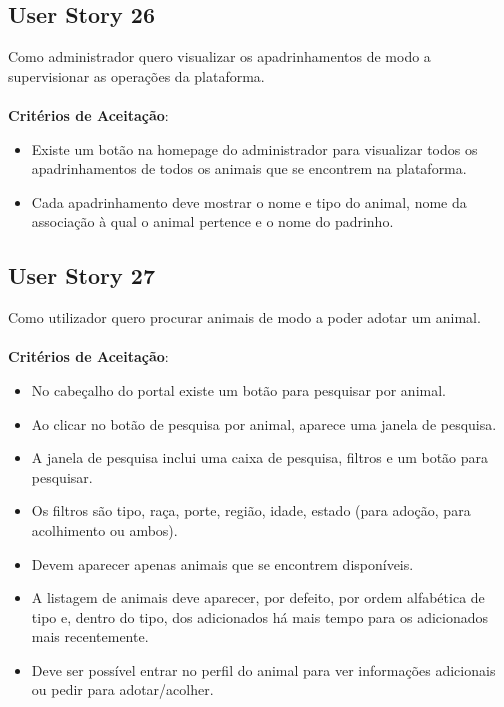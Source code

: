 \documentclass[a4paper,11pt]{article}
\begin{document}
\subsection*{User Story 26}
Como administrador quero visualizar os apadrinhamentos de modo a supervisionar as operações da plataforma.\\\\
\textbf{Critérios de Aceitação}:
\begin{itemize}
  \item Existe um botão na homepage do administrador para visualizar todos os apadrinhamentos de todos os animais que se encontrem na plataforma.
  \item Cada apadrinhamento deve mostrar o nome e tipo do animal, nome da associação à qual o animal pertence e o nome do padrinho.
\end{itemize}

\subsection*{User Story 27}
Como utilizador quero procurar animais de modo a poder adotar um animal.\\\\
\textbf{Critérios de Aceitação}:
\begin{itemize}
  \item No cabeçalho do portal existe um botão para pesquisar por animal.
  \item Ao clicar no botão de pesquisa por animal, aparece uma janela de pesquisa.
  \item A janela de pesquisa inclui uma caixa de pesquisa, filtros e um botão para pesquisar.
  \item Os filtros são tipo, raça, porte, região, idade, estado (para adoção, para acolhimento ou ambos).
  \item Devem aparecer apenas animais que se encontrem disponíveis.
  \item A listagem de animais deve aparecer, por defeito, por ordem alfabética de tipo e, dentro do tipo, dos adicionados há mais tempo para os adicionados mais recentemente.
  \item Deve ser possível entrar no perfil do animal para ver informações adicionais ou pedir para adotar/acolher.
\end{itemize}
\end{document}
